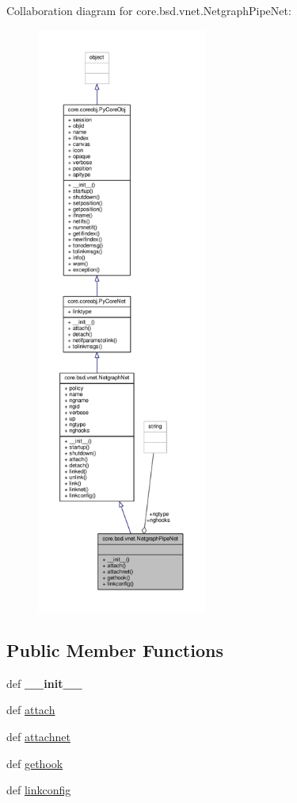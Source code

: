 Collaboration diagram for core.\+bsd.\+vnet.\+Netgraph\+Pipe\+Net\+:
\nopagebreak
\begin{figure}[H]
\begin{center}
\leavevmode
\includegraphics[height=550pt]{classcore_1_1bsd_1_1vnet_1_1_netgraph_pipe_net__coll__graph}
\end{center}
\end{figure}
\subsection*{Public Member Functions}
\begin{DoxyCompactItemize}
\item 
\hypertarget{classcore_1_1bsd_1_1vnet_1_1_netgraph_pipe_net_a66371a5ebd93660bcd524386bb43d02c}{def {\bfseries \+\_\+\+\_\+init\+\_\+\+\_\+}}\label{classcore_1_1bsd_1_1vnet_1_1_netgraph_pipe_net_a66371a5ebd93660bcd524386bb43d02c}

\item 
def \hyperlink{classcore_1_1bsd_1_1vnet_1_1_netgraph_pipe_net_ac548ea89ea3518e42c0be6109e1b1ed4}{attach}
\item 
def \hyperlink{classcore_1_1bsd_1_1vnet_1_1_netgraph_pipe_net_ab6a00a3f30407994a536462eb84e5599}{attachnet}
\item 
def \hyperlink{classcore_1_1bsd_1_1vnet_1_1_netgraph_pipe_net_a438e4a4de088949c8dd39cba4f08979c}{gethook}
\item 
def \hyperlink{classcore_1_1bsd_1_1vnet_1_1_netgraph_pipe_net_ad2c48e744f15be5f48b1c0e16e0b5286}{linkconfig}
\end{DoxyCompactItemize}
